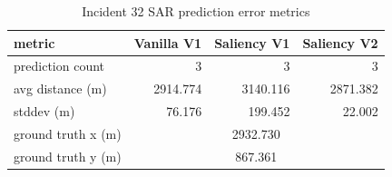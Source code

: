 \begin{table}[ht]
\centering
\caption{Incident 32 SAR prediction error metrics}
\label{tab:sar-incident-32}
\begin{tabular}{lrrr}
\hline
metric & Vanilla V1 & Saliency V1 & Saliency V2 \\
\hline
prediction count & 3 & 3 & 3 \\
avg distance (m) & 2914.774 & 3140.116 & 2871.382 \\
stddev (m) & 76.176 & 199.452 & 22.002 \\
ground truth x (m) & \multicolumn{3}{c}{2932.730} \\
ground truth y (m) & \multicolumn{3}{c}{867.361} \\
\hline
\end{tabular}
\end{table}
